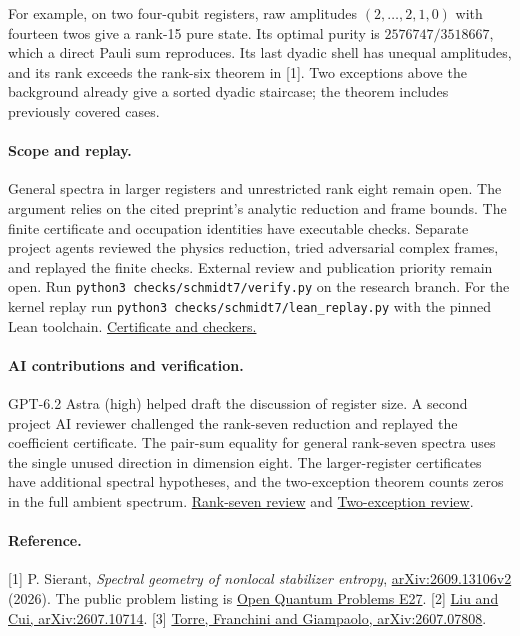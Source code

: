 \documentclass[11pt]{article}
\begin{document}
For example, on two four-qubit registers, raw amplitudes $(2,\ldots,2,1,0)$ with fourteen twos give a rank-15 pure state. Its optimal purity is $2576747/3518667$, which a direct Pauli sum reproduces. Its last dyadic shell has unequal amplitudes, and its rank exceeds the rank-six theorem in [1]. Two exceptions above the background already give a sorted dyadic staircase; the theorem includes previously covered cases.


\paragraph{Scope and replay.} General spectra in larger registers and unrestricted rank eight remain open. The argument relies on the cited preprint's analytic reduction and frame bounds. The finite certificate and occupation identities have executable checks. Separate project agents reviewed the physics reduction, tried adversarial complex frames, and replayed the finite checks. External review and publication priority remain open. Run \texttt{python3 checks/schmidt7/verify.py} on the research branch. For the kernel replay run \texttt{python3 checks/schmidt7/lean\_replay.py} with the pinned Lean toolchain. \href{https://github.com/shunyaekam/oo-research/tree/research/checks/schmidt7}{Certificate and checkers.}

\paragraph{AI contributions and verification.} GPT-6.2 Astra (high) helped draft the discussion of register size. A second project AI reviewer challenged the rank-seven reduction and replayed the coefficient certificate. The pair-sum equality for general rank-seven spectra uses the single unused direction in dimension eight. The larger-register certificates have additional spectral hypotheses, and the two-exception theorem counts zeros in the full ambient spectrum. \href{https://github.com/shunyaekam/oo-research/blob/a5cde30636afbfe599efab6bf8bbbafe9c640c22/checks/schmidt7/review.md}{Rank-seven review} and \href{https://github.com/shunyaekam/oo-research/blob/a5cde30636afbfe599efab6bf8bbbafe9c640c22/checks/two-outliers/review.md}{Two-exception review}.

\paragraph{Reference.} [1] P. Sierant, \emph{Spectral geometry of nonlocal stabilizer entropy}, \href{https://arxiv.org/html/2609.13106v2}{arXiv:2609.13106v2} (2026). The public problem listing is \href{https://open-quantum-problems.vercel.app/p/E27}{Open Quantum Problems E27}.
 [2] \href{https://arxiv.org/abs/2607.10714}{Liu and Cui, arXiv:2607.10714}. [3] \href{https://arxiv.org/abs/2607.07808}{Torre, Franchini and Giampaolo, arXiv:2607.07808}.
\end{document}
